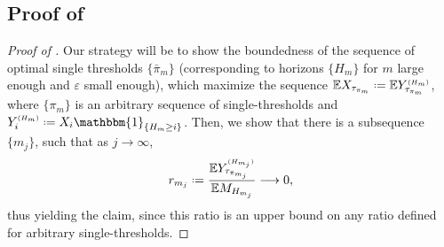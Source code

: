 \documentclass[11pt, a4paper, twoside]{article}
\newcommand*{\defeq}{\mathrel{\vcenter{\baselineskip0.5ex \lineskiplimit0pt
			\hbox{\scriptsize.}\hbox{\scriptsize.}}}=}
\newcommand{\ssup}[1]{{\scriptscriptstyle{({#1})}}}
\newcommand{\eps}{\varepsilon}
\newcommand{\EE}{\mathbb{E}}
\newcommand{\II}{\mathbbm{1}}
\numberwithin{equation}{section}
\begin{document}
	\subsection{Proof  of }\label{supphardsecretaryprop}
    \begin{proof}[Proof of ]
		Our strategy will be to show the boundedness of the sequence of optimal single thresholds $\{\bar{\pi}_m\}$ (corresponding to horizons $\{H_m\}$ for $m$ large enough and $\eps$ small enough), which maximize the sequence $\EE X_{\tau_{\pi_m}}\defeq\EE Y_{\tau_{\pi_m}}^\ssup{H_m}$, where $\{\pi_m\}$ is an arbitrary sequence of single-thresholds and $Y_{i}^\ssup{H_m}\defeq X_i\II_{\{H_m\ge i\}}$. 
        Then, we show that there is a subsequence $\{m_j\}$, such that as $j\longrightarrow\infty$,
		\begin{equation}\label{subsequence}
			r_{m_j}\defeq\frac{\EE Y_{\tau_{\bar{\pi}_{m_j}}}^\ssup{H_{m_j}}}{\EE M_{H_{m_j}}}\longrightarrow 0,
		\end{equation} 
		thus yielding the claim, since this ratio is an upper bound on any ratio defined for arbitrary single-thresholds. 
		

\end{proof}
\end{document}
